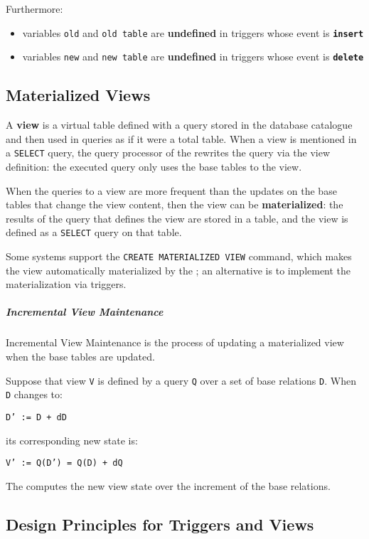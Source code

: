 \documentclass[english]{article}
\begin{document}
Furthermore:

\begin{itemize}
  \item variables \texttt{old} and \texttt{old table} are \textbf{undefined} in triggers whose event is \textbf{\texttt{insert}}
  \item variables \texttt{new} and \texttt{new table} are \textbf{undefined} in triggers whose event is \textbf{\texttt{delete}}
\end{itemize}

\subsection{Materialized Views}

A \textbf{view} is a virtual table defined with a query stored in the database catalogue and then used in queries as if it were a total table.
When a view is mentioned in a \texttt{SELECT} query, the query processor of the \dbms rewrites the query via the view definition:
the executed query only uses the base tables to the view.

When the queries to a view are more frequent than the updates on the base tables that change the view content, then the view can be \textbf{materialized}:
the results of the query that defines the view are stored in a table, and the view is defined as a \texttt{SELECT} query on that table.

Some systems support the \texttt{CREATE MATERIALIZED VIEW} command, which makes the view automatically materialized by the \dbms;
an alternative is to implement the materialization via triggers.

\subparagraph*{Incremental View Maintenance}
Incremental View Maintenance is the process of updating a materialized view when the base tables are updated.

Suppose that view \texttt{V} is defined by a query \texttt{Q} over a set of base relations \texttt{D}.
When \texttt{D} changes to:
\begin{center}
  \texttt{D' := D + dD}
\end{center}
its corresponding new state is:
\begin{center}
  \texttt{V' := Q(D') = Q(D) + dQ}
\end{center}
The \dbms computes the new view state over the increment of the base relations.

\subsection{Design Principles for Triggers and Views}
\end{document}
